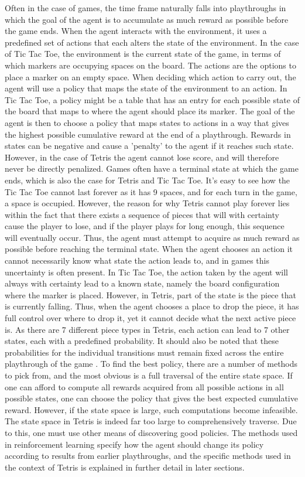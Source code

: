 Often in the case of games, the 
time frame naturally falls into playthroughs in which the 
goal of the agent is to accumulate as much reward as possible 
before the game ends.
When the agent interacts 
with the environment, it uses a predefined set of actions
that each alters the state of the environment. In the case of 
Tic Tac Toe, the environment is the current state of the game, 
in terms of which markers are occupying spaces on the board.
The actions are the options to place a marker
on an empty space.
When deciding which action to carry out, the agent will use
a policy that maps the state of the environment to an action.
In Tic Tac Toe, a policy might be a table that has an entry for each possible
state of the board that maps to where the agent should place its marker.
The goal of the agent is then to choose a policy that maps states to actions 
in a way that
gives the highest possible cumulative reward at the end of a playthrough. 
Rewards in states can be negative and cause a 'penalty' to the agent if it reaches
such state. However, in the case of Tetris the agent cannot lose score,
and will therefore never be directly  penalized.
Games often have a terminal state at which the game ends, which is 
also the case for Tetris and Tic Tac Toe. It's easy to see how the
Tic Tac Toe cannot last forever as it has 9 spaces, and for each turn in the game,
a space is occupied. However, the reason for why Tetris cannot play forever
lies within the fact that there exists a sequence of pieces that will
with certainty cause the player to lose, and if the player plays for 
long enough, this sequence will eventually occur. Thus, the agent must
attempt to acquire as much reward as possible before reaching the terminal 
state. 
When the agent chooses an action it cannot necessarily know what state
the action leads to, and in games this uncertainty is often present.
In Tic Tac Toe, the action taken by the agent will always with certainty 
lead to a known state, namely the board configuration where the marker is placed.
However, in Tetris, part of the state is the piece that is currently falling.
Thus, when the agent chooses a place to drop the piece, it has full control
over where to drop it, yet it cannot decide what the next active piece is.
As there are 7 different piece
types in Tetris, each action can lead to 7 other states, each with a predefined probability.
It should also be noted that these probabilities for the individual transitions
must remain fixed across the entire playthrough of the game \citep{Carr}.
To find the best policy, there are a number of methods to pick from,
and the most obvious is a full traversal of the entire state space.
If one can afford to compute all rewards acquired from all possible 
actions in all possible states, one can choose the policy 
that gives the best expected cumulative reward. However, if the state space is
large, such computations become infeasible. The state space in Tetris
is indeed far too large to comprehensively traverse.
Due to this, one must use other means of discovering good policies.
The methods used in reinforcement learning 
specify how the agent should change its policy according to 
results from earlier playthroughs, and the specific methods used in
the context of Tetris is explained in further detail in later sections.


